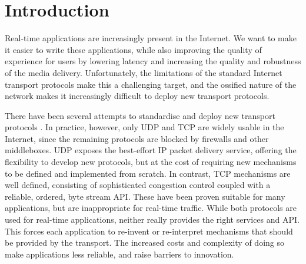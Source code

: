 \documentclass{sig-alternate-05-2015}
\begin{document}

\printccsdesc

\section{Introduction}

%

Real-time applications are increasingly present in the Internet. We want
to make it easier to write these applications, while also improving the
quality of experience for users by lowering latency and increasing the
quality and robustness of the media delivery.
Unfortunately, the limitations of the standard Internet transport protocols
make this a challenging target, and the ossified nature of the network
makes it increasingly difficult to deploy new transport protocols.


There have been several attempts to standardise and deploy new transport 
protocols \cite{rfc:4340,RFC4960}.
In practice, however, only UDP and TCP are widely usable in the Internet,
since the remaining protocols are blocked by firewalls and other
middleboxes. UDP exposes the best-effort IP packet delivery service,
offering the flexibility to develop new protocols, but at the cost of
requiring new mechanisms to be defined and implemented from scratch.
In contrast, TCP mechanisms are well defined, consisting of sophisticated
congestion control coupled with a reliable, ordered, byte stream API.
These have been proven suitable for many applications, but are inappropriate
for real-time traffic. While both protocols are used for real-time
applications, neither really provides the right services and API. This
forces each application to re-invent or re-interpret mechanisms that
should be provided by the transport. The increased costs and
complexity of doing so make applications less reliable, and raise barriers to innovation.
\end{document}
